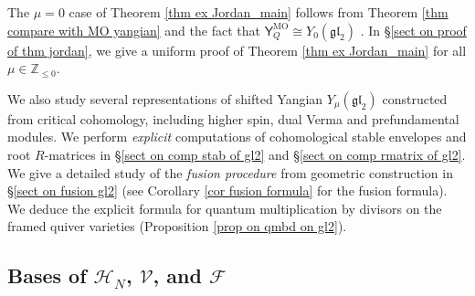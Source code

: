 \documentclass[10pt]{amsart}
\theoremstyle{definition}
\numberwithin{equation}{section}
\newcommand{\bZ}{\mathbb{Z}}
\begin{document}
The $\mu=0$ case of Theorem \ref{thm ex Jordan_main} follows from Theorem \ref{thm compare with MO yangian} and the fact that $\mathsf Y^{\mathrm{MO}}_Q\cong Y_0(\mathfrak{gl}_2)$ \cite[Prop.\,11.3.1]{MO}. In \S \ref{sect on proof of thm jordan}, we give a uniform proof of Theorem \ref{thm ex Jordan_main} for all $\mu\in \bZ_{\leqslant 0}$.

We also study several representations of shifted Yangian $Y_{\mu}(\mathfrak{gl}_2)$ constructed from critical cohomology, including 
higher spin, dual Verma and prefundamental modules.
We perform \textit{explicit} computations of cohomological stable envelopes and root $R$-matrices in \S \ref{sect on comp stab of gl2} and 
\S \ref{sect on comp rmatrix of gl2}. We give a detailed study of the \textit{fusion procedure} from geometric construction in \S \ref{sect on fusion gl2} (see Corollary \ref{cor fusion formula} for the fusion formula). 
We deduce the explicit formula for quantum multiplication by divisors on the framed quiver varieties (Proposition \ref{prop on qmbd on gl2}). 



\subsection{Bases of \texorpdfstring{$\mathcal H_N$}{HN}, \texorpdfstring{$\mathcal V$}{V}, and \texorpdfstring{$\mathcal F$}{F}}\label{sec bases of H_N, V, F}
\end{document}
